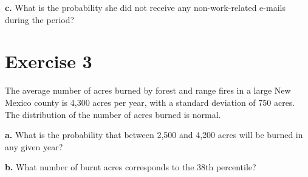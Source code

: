 \documentclass[12pt,letterpaper]{article}
\begin{document}
\textbf{c.} What is the probability she did not receive any non-work-related e-mails during the
period?

\section*{Exercise 3}
The average number of acres burned by forest and range fires in a large New Mexico county is 4,300 acres per year, with a standard deviation of 750 acres. The distribution of the number of acres burned is normal.

\textbf{a.} What is the probability that between 2,500 and 4,200 acres will be burned in any given year? 

\textbf{b.}  What number of burnt acres corresponds to the 38th percentile? 
\end{document}
